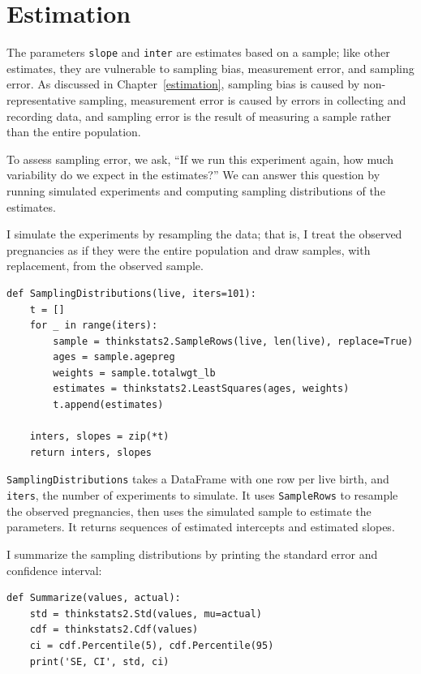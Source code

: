 \documentclass[12pt]{book}
\begin{document}
\section{Estimation}
\label{regest}

The parameters {\tt slope} and {\tt inter} are estimates based on a
sample; like other estimates, they are vulnerable to sampling bias,
measurement error, and sampling error.  As discussed in
Chapter~\ref{estimation}, sampling bias is caused by non-representative
sampling, measurement error is caused by errors in collecting
and recording data, and sampling error is the result of measuring a
sample rather than the entire population.

To assess sampling error, we ask, ``If we run this experiment again,
how much variability do we expect in the estimates?''  We can
answer this question by running simulated experiments and computing
sampling distributions of the estimates.

I simulate the experiments by resampling the data; that is, I treat
the observed pregnancies as if they were the entire population
and draw samples, with replacement, from the observed sample.

\begin{verbatim}
def SamplingDistributions(live, iters=101):
    t = []
    for _ in range(iters):
        sample = thinkstats2.SampleRows(live, len(live), replace=True)
        ages = sample.agepreg
        weights = sample.totalwgt_lb
        estimates = thinkstats2.LeastSquares(ages, weights)
        t.append(estimates)

    inters, slopes = zip(*t)
    return inters, slopes
\end{verbatim}

{\tt SamplingDistributions} takes a DataFrame with one row
per live birth, and {\tt iters}, the number of experiments to simulate.
It uses {\tt SampleRows} to resample the observed pregnancies,
then uses the simulated sample to estimate the parameters.
It returns sequences
of estimated intercepts and estimated slopes.

I summarize the sampling distributions by printing the standard
error and confidence interval:

\begin{verbatim}
def Summarize(values, actual):
    std = thinkstats2.Std(values, mu=actual)
    cdf = thinkstats2.Cdf(values)
    ci = cdf.Percentile(5), cdf.Percentile(95)
    print('SE, CI', std, ci)
\end{verbatim}
\end{document}
